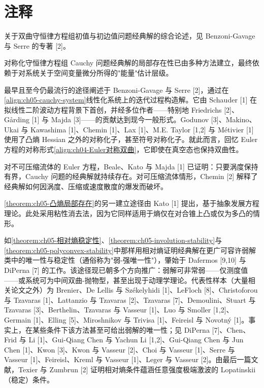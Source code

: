 \documentclass[../../main.tex]{subfiles}
\begin{document}
\section{注释}\label{section:ch05-注释}

关于双曲守恒律方程组初值与初边值问题经典解的综合论述，见 Benzoni-Gavage 与 Serre 的专著 [2]。

对称化守恒律方程组 Cauchy 问题经典解的局部存在性已由多种方法建立，最终依赖于对系统关于空间变量微分所得的"能量"估计层级。

最早且至今仍最流行的途径阐述于 Benzoni-Gavage 与 Serre [2]，通过在\eqref{align:ch05-cauchy-system}线性化系统上的迭代过程构造解。它由 Schauder [1] 在拟线性二阶波动方程背景下首创，并经多位作者——特别地 Friedrichs [2]、Gårding [1] 与 Majda [3]——的贡献达到现今一般形式。Godunov [3]、Makino、Ukai 与 Kawashima [1]、Chemin [1]、Lax [1]、M.E. Taylor [1,2] 与 Métivier [1] 使用了凸熵 Hessian 之外的对称化子，甚至符号对称化子。就此而言，回忆 Euler 方程的对称形式\eqref{align:ch04-Euler对称双曲}，它即使在真空态也保持双曲性。

对不可压缩流体的 Euler 方程，Beale、Kato 与 Majda [1] 已证明：只要涡度保持有界，Cauchy 问题的经典解就持续存在。对可压缩流体情形，Chemin [2] 解释了经典解如何因涡度、压缩或速度散度的爆发而破坏。

\cref{theorem:ch05-凸熵局部存在}的另一建立途径由 Kato [1] 提出，基于抽象发展方程理论。此处采用粘性消去法，因为它同样适用于熵仅在对合锥上凸或仅为多凸的情形。

如\cref{theorem:ch05-相对熵稳定性}、\cref{theorem:ch05-involution-stability}与\cref{theorem:ch05-polyconvex-stability}中那样用相对熵证明经典解在更广可容许弱解类中的唯一性与稳定性（通俗称为"弱-强唯一性"），肇始于 Dafermos [9,10] 与 DiPerna [7] 的工作。该途径现已朝多个方向推广：弱解可非常弱——仅测度值——或系统可为中间双曲-抛物型，甚至出现于动理学理论。代表性样本（大量相关论文之外）为 Brenier、De Lellis 与 Székelyhidi [1]、LeFloch [8]、Christoforou 与 Tzavaras [1]、Lattanzio 与 Tzavaras [2]、Tzavaras [7]、Demoulini、Stuart 与 Tzavaras [3]、Berthelin、Tzavaras 与 Vasseur [1]、Luo 与 Smoller [1,2]、Germain [1]、Elling [5]、Miroshnikov 与 Trivisa [1]、Feireisl 与 Novotný [1]。事实上，在某些条件下该方法甚至可给出弱解的唯一性；见 DiPerna [7]、Chen、Frid 与 Li [1]、Gui-Qiang Chen 与 Yachun Li [1,2]、Gui-Qiang Chen 与 Jun Chen [1]、Kwon [3]、Kwon 与 Vasseur [2]、Choi 与 Vasseur [1]、Serre 与 Vasseur [1]、Feireisl、Kreml 与 Vasseur [1]、Leger 与 Vasseur [2]。由最后一篇文献，Texier 与 Zumbrun [2] 证明相对熵条件蕴涵任意强度极端激波的 Lopatinskii（稳定）条件。
\end{document}
